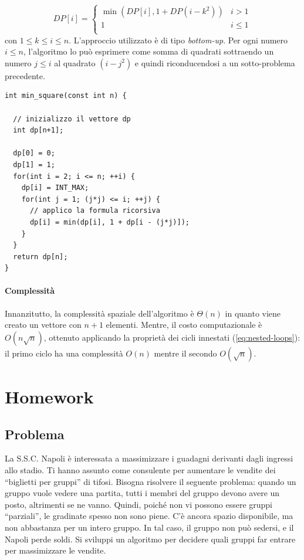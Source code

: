 \documentclass{article}
\begin{document}
\begin{equation*}
    DP[i]=\begin{cases}
        \min(DP[i], 1 + DP(i-k^2))& i > 1 \\
        1 & i \leq 1 \\
    \end{cases}
\end{equation*}
con $1\leq k \leq i \leq n$. L'approccio utilizzato è di tipo \textit{bottom-up}. Per ogni numero $i \leq n$, l'algoritmo lo può esprimere come somma di quadrati sottraendo un numero  $j\leq i$ al quadrato $(i - j^2)$ e quindi riconducendosi a un sotto-problema precedente.

\begin{lstlisting}[caption={Calcolo del numero minimi di quadrati per rappresentare un numero $n$},captionpos=b]
int min_square(const int n) {
  
  // inizializzo il vettore dp
  int dp[n+1];

  dp[0] = 0;
  dp[1] = 1;
  for(int i = 2; i <= n; ++i) {
    dp[i] = INT_MAX;
    for(int j = 1; (j*j) <= i; ++j) {
      // applico la formula ricorsiva
      dp[i] = min(dp[i], 1 + dp[i - (j*j)]);
    }
  }
  return dp[n];
}
\end{lstlisting}

\paragraph{Complessità}
Innanzitutto, la complessità spaziale dell'algoritmo è $\Theta(n)$ in quanto viene creato un vettore con $n+1$ elementi. Mentre, il costo computazionale è $O(n\sqrt{n})$, ottenuto applicando la proprietà dei cicli innestati (\cref{eq:nested-loops}): il primo ciclo ha una complessità $O(n)$ mentre il secondo $O(\sqrt{n})$.

\clearpage

\section{Homework}
\subsection{Problema}
La S.S.C. Napoli è interessata a massimizzare i guadagni derivanti dagli ingressi allo stadio.
Ti hanno assunto come consulente per aumentare le vendite dei “biglietti per gruppi” di
tifosi. Bisogna risolvere il seguente problema: quando un gruppo vuole vedere una partita,
tutti i membri del gruppo devono avere un posto, altrimenti se ne vanno. Quindi, poiché non
vi possono essere gruppi “parziali”, le gradinate spesso non sono piene. C'è ancora spazio
disponibile, ma non abbastanza per un intero gruppo. In tal caso, il gruppo non può sedersi,
e il Napoli perde soldi. Si sviluppi un algoritmo per decidere quali gruppi far entrare per
massimizzare le vendite.
\end{document}
